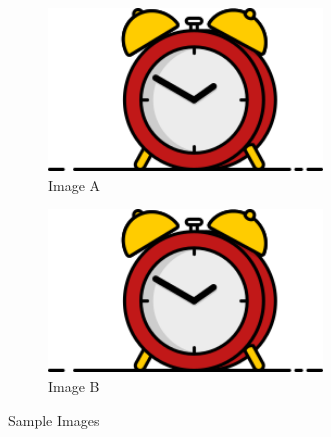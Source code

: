 \documentclass[twoside]{report}
\numberwithin{equation}{section}		%
\numberwithin{figure}{section}			%
\numberwithin{table}{section}
\begin{document}
    \begin{figure}
        \centering
        \begin{subfigure}[b]{0.45\textwidth}
            \centering
            \includegraphics[width=0.8\textwidth,totalheight=\textheight,keepaspectratio]{front_page_logo.png}
            \caption{Image A}
        \end{subfigure}
        \hfill
        \begin{subfigure}[b]{0.45\textwidth}
            \centering
            \includegraphics[width=0.8\textwidth,totalheight=\textheight,keepaspectratio]{front_page_logo.png}
            \caption{Image B}
        \end{subfigure}
        \caption{Sample Images}
    \end{figure}
\end{document}
